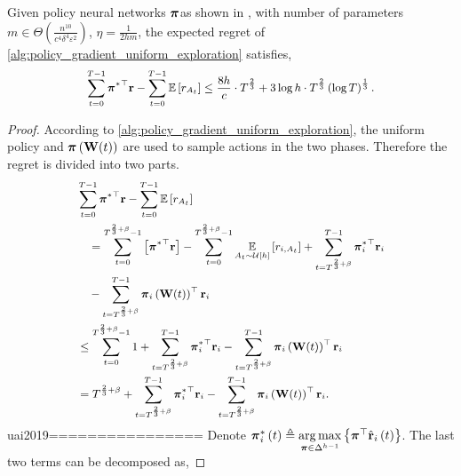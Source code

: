 \begin{thm}
\label{thm:policy_gradient_main_result}
    Given policy neural networks ${\boldsymbol{\pi}} $as shown in , with number of parameters $m \in \Theta\left( \frac{n^{10}}{c^4 \delta^4 \varepsilon^2} \right)$, $\eta = \frac{1}{2 h m}$, the expected regret of \cref{alg:policy_gradient_uniform_exploration} satisfies,
\begin{equation*}
\small
\begin{split}
    \sum\limits_{t=0}^{T-1}{ {\rvpi^*}^\top \rvr } - \sum\limits_{t=0}^{T-1}{ \sE \left[ r_{A_t} \right] } \le \frac{8 h}{c} \cdot T^{\frac{2}{3}} + 3 \log{h} \cdot T^{\frac{2}{3}} \left(\log{T}\right)^{\frac{1}{3}}.
\end{split}
\end{equation*}
\end{thm}
\begin{proof}
According to \cref{alg:policy_gradient_uniform_exploration}, the uniform policy and ${\boldsymbol{\pi}}\left( {\mathbf{W}}(t) \right)$ are used to sample actions in the two phases. Therefore the regret is divided into two parts.
\begin{equation}
\small
\label{eq:total_regret_decomposition}
\begin{split}
    &\sum\limits_{t=0}^{T-1}{ {\rvpi^*}^\top \rvr } - \sum\limits_{t=0}^{T-1}{ \sE \left[ r_{ A_t} \right] } \\
    &\quad = \sum\limits_{t=0}^{T^{\frac{2}{3} + \beta} - 1}{ \left[ {\rvpi^*}^\top \rvr  \right]} - \sum\limits_{t=0}^{T^{\frac{2}{3} + \beta} - 1}{ \expectation\limits_{A_t \sim \gU\left[h\right]}{ \left[ r_{i, A_t} \right] }} + \sum\limits_{t=T^{\frac{2}{3} + \beta}}^{T-1}{ {\rvpi_i^*}^\top \rvr_i } \\
    &\quad - \sum\limits_{t=T^{\frac{2}{3} + \beta}}^{T-1}{ \rvpi_i\left( \rmW(t) \right)^\top \rvr_i } \\
    &\le \sum\limits_{t=0}^{T^{\frac{2}{3} + \beta} - 1}{1} + \sum\limits_{t=T^{\frac{2}{3} + \beta}}^{T-1}{ {\rvpi_i^*}^\top \rvr_i } - \sum\limits_{t=T^{\frac{2}{3} + \beta}}^{T-1}{ \rvpi_i\left( \rmW(t) \right)^\top \rvr_i } \\
    &= T^{\frac{2}{3} + \beta} + \sum\limits_{t=T^{\frac{2}{3} + \beta}}^{T-1}{ {\rvpi_i^*}^\top \rvr_i } - \sum\limits_{t=T^{\frac{2}{3} + \beta}}^{T-1}{ \rvpi_i\left( \rmW(t) \right)^\top \rvr_i }.
\end{split}
\end{equation}
uai2019================
Denote ${\boldsymbol{\pi}}_i^*\left(t\right) \triangleq \operatorname*{arg\,max}\limits_{{\boldsymbol{\pi}} \in \Delta^{h-1}}{\left\{ {\boldsymbol{\pi}}^\top \hat{{\mathbf{r}}}_i\left(t\right)\right\}}$. The last two terms can be decomposed as,

\end{proof}
